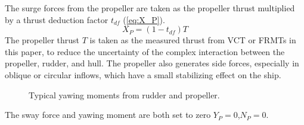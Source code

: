 The surge forces from the propeller are taken as the propeller thrust multiplied by a thrust deduction factor $t_{df}$ (\autoref{eq:X_P}).
\begin{equation}
    \label{eq:X_P}
    X_P = (1-t_{df})T
\end{equation}
The propeller thrust $T$ is taken as the measured thrust from VCT or FRMTs in this paper, to reduce the uncertainty of the complex interaction between the propeller, rudder, and hull. The propeller also generates side forces, especially in oblique or circular inflows, which have a small stabilizing effect on the ship. 
\begin{figure}[h]
    \centering
    
    \caption{Typical yawing moments from rudder and propeller.}
    \label{fig:propeller_size_force}
\end{figure}
The sway force and yawing moment are both set to zero $Y_P=0$,$N_P=0$. 
